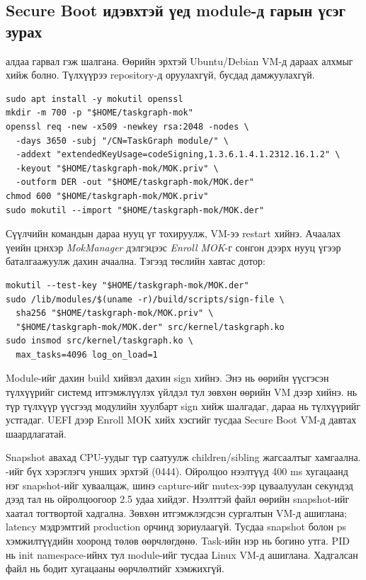 \subsection{Secure Boot идэвхтэй үед module-д гарын үсэг зурах}
 алдаа гарвал  гэж шалгана. Өөрийн эрхтэй Ubuntu/Debian VM-д дараах алхмыг хийж болно. Түлхүүрээ repository-д оруулахгүй, бусдад дамжуулахгүй.\par
\begin{lstlisting}
sudo apt install -y mokutil openssl
mkdir -m 700 -p "$HOME/taskgraph-mok"
openssl req -new -x509 -newkey rsa:2048 -nodes \
  -days 3650 -subj "/CN=TaskGraph module/" \
  -addext "extendedKeyUsage=codeSigning,1.3.6.1.4.1.2312.16.1.2" \
  -keyout "$HOME/taskgraph-mok/MOK.priv" \
  -outform DER -out "$HOME/taskgraph-mok/MOK.der"
chmod 600 "$HOME/taskgraph-mok/MOK.priv"
sudo mokutil --import "$HOME/taskgraph-mok/MOK.der"
\end{lstlisting}
Сүүлчийн командын дараа нууц үг тохируулж, VM-ээ restart хийнэ. Ачаалах үеийн цэнхэр \textit{MokManager} дэлгэцээс \textit{Enroll MOK}-г сонгон дээрх нууц үгээр баталгаажуулж дахин ачаална. Тэгээд төслийн хавтас дотор:\par
\begin{lstlisting}
mokutil --test-key "$HOME/taskgraph-mok/MOK.der"
sudo /lib/modules/$(uname -r)/build/scripts/sign-file \
  sha256 "$HOME/taskgraph-mok/MOK.priv" \
  "$HOME/taskgraph-mok/MOK.der" src/kernel/taskgraph.ko
sudo insmod src/kernel/taskgraph.ko \
  max_tasks=4096 log_on_load=1
\end{lstlisting}
Module-ийг дахин build хийвэл дахин sign хийнэ. Энэ нь өөрийн үүсгэсэн түлхүүрийг системд итгэмжлүүлэх үйлдэл тул зөвхөн өөрийн VM дээр хийнэ.  нь түр түлхүүр үүсгээд модулийн хуулбарт sign хийж шалгадаг, дараа нь түлхүүрийг устгадаг. UEFI дээр Enroll MOK хийх хэсгийг тусдаа Secure Boot VM-д давтах шаардлагатай.\par

Snapshot авахад \code{stop\_machine()} CPU-уудыг түр саатуулж children/sibling жагсаалтыг хамгаална. -ийг бүх хэрэглэгч унших эрхтэй (0444). Ойролцоо нээлтүүд 400 ms хугацаанд нэг snapshot-ийг хуваалцаж, шинэ capture-ийг mutex-ээр цуваалуулан секундэд дээд тал нь ойролцоогоор 2.5 удаа хийдэг. Нээлттэй файл өөрийн snapshot-ийг хаатал тогтвортой хадгална. Зөвхөн итгэмжлэгдсэн сургалтын VM-д ашиглана; latency мэдрэмтгий production орчинд зориулаагүй. Тусдаа snapshot болон ps хэмжилтүүдийн хооронд төлөв өөрчлөгдөнө. Task-ийн нэр нь богино  утга. PID нь init namespace-ийнх тул module-ийг тусдаа Linux VM-д ашиглана. Хадгалсан файл нь бодит хугацааны өөрчлөлтийг хэмжихгүй.

